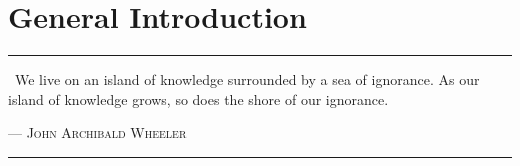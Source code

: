 \chapter*{General Introduction}
{\color{purple}\titlerule[2.5pt]}
\vspace{4pc}%

\vspace*{3pc}
\begin{center}
\begin{minipage}{0.7\linewidth}
\hrule
\vspace{8pt}
{\huge\guillemotleft} ~We live on an island of knowledge surrounded by a sea of ignorance. As our island of knowledge grows, so does the shore of our ignorance. {\huge\guillemotright} \\
\vspace{2pt}
\begin{flushright}
--- \textsc{John Archibald Wheeler}
\end{flushright}
\vspace{8pt}
\hrule
\end{minipage}
\end{center}
\vspace{3pc}


